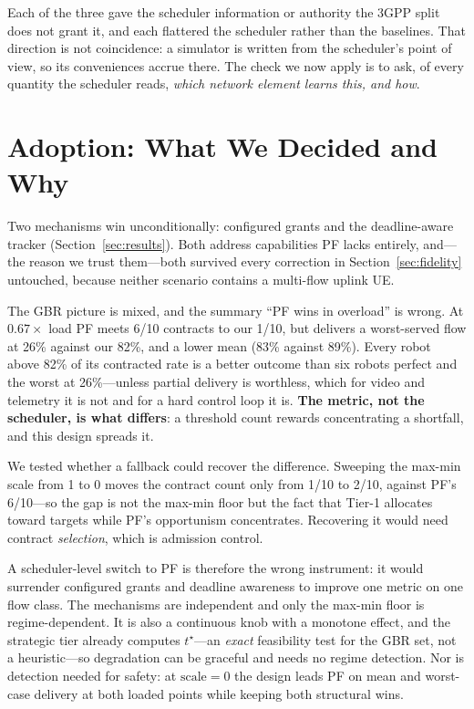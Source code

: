 \documentclass[conference]{IEEEtran}
\begin{document}
Each of the three gave the scheduler information or authority the 3GPP split
does not grant it, and each flattered the scheduler rather than the
baselines. That direction is not coincidence: a simulator is written from the
scheduler's point of view, so its conveniences accrue there. The check we now
apply is to ask, of every quantity the scheduler reads, \emph{which network
element learns this, and how}.

\section{Adoption: What We Decided and Why}\label{sec:adopt}

Two mechanisms win unconditionally: configured grants and the deadline-aware
tracker (Section~\ref{sec:results}). Both address capabilities PF lacks
entirely, and---the reason we trust them---both survived every correction in
Section~\ref{sec:fidelity} untouched, because neither scenario contains a
multi-flow uplink UE.

The GBR picture is mixed, and the summary ``PF wins in overload'' is wrong.
At $0.67\times$ load PF meets 6/10 contracts to our 1/10, but delivers a
worst-served flow at 26\% against our 82\%, and a lower mean (83\% against
89\%). Every robot above 82\% of its contracted rate is a better outcome than
six robots perfect and the worst at 26\%---unless partial delivery is
worthless, which for video and telemetry it is not and for a hard control
loop it is. \textbf{The metric, not the scheduler, is what differs}: a
threshold count rewards concentrating a shortfall, and this design spreads
it.

We tested whether a fallback could recover the difference. Sweeping the
max-min scale from 1 to 0 moves the contract count only from 1/10 to 2/10,
against PF's 6/10---so the gap is not the max-min floor but the fact that
Tier-1 allocates toward targets while PF's opportunism concentrates.
Recovering it would need contract \emph{selection}, which is admission
control.

A scheduler-level switch to PF is therefore the wrong instrument: it would
surrender configured grants and deadline awareness to improve one metric on
one flow class. The mechanisms are independent and only the max-min floor is
regime-dependent. It is also a continuous knob with a monotone effect, and
the strategic tier already computes $t^\star$---an \emph{exact} feasibility
test for the GBR set, not a heuristic---so degradation can be graceful and
needs no regime detection. Nor is detection needed for safety: at
$\mathrm{scale}=0$ the design leads PF on mean and worst-case delivery at
both loaded points while keeping both structural wins.
\end{document}
